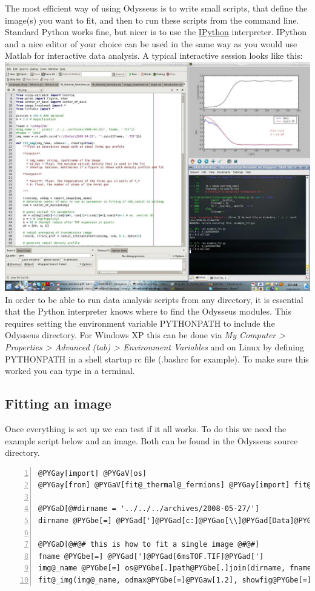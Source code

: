 \documentclass[letterpaper,10pt,english]{manual}
\begin{document}
The most efficient way of using Odysseus is to write small scripts, that define the image(s) you want to fit, and then to run these scripts from the command line. Standard Python works fine, but nicer is to use the \href{http://ipython.scipy.org/moin/}{IPython} interpreter. IPython and a nice editor of your choice can be used in the same way as you would use Matlab for interactive data analysis. A typical interactive session looks like this:
\includegraphics[width=500pt]{interactive_python.jpg}
In order to be able to run data analysis scripts from any directory, it is essential that the Python interpreter knows where to find the Odysseus modules. This requires setting the environment variable PYTHONPATH to include the Odysseus directory. For Windows XP this can be done via \emph{My Computer \textgreater{} Properties \textgreater{} Advanced (tab) \textgreater{} Environment Variables} and on Linux by defining PYTHONPATH in a shell startup rc file (.bashrc for example). To make sure this worked you can type  in a terminal.


\subsection{Fitting an image}

Once everything is set up we can test if it all works. To do this we need the example script below and an image. Both can be found in the Odysseus source directory.

\begin{Verbatim}[commandchars=@\[\],numbers=left,firstnumber=1,stepnumber=1]
@PYGay[import] @PYGaV[os]
@PYGay[from] @PYGaV[fit@_thermal@_fermions] @PYGay[import] fit@_img

@PYGaD[@#dirname = '../../../archives/2008-05-27/']
dirname @PYGbe[=] @PYGad[']@PYGad[c:]@PYGao[\\]@PYGad[Data]@PYGao[\\]@PYGad[2008-05-27]@PYGad[']

@PYGaD[@#@# this is how to fit a single image @#@#]
fname @PYGbe[=] @PYGad[']@PYGad[6msTOF.TIF]@PYGad[']
img@_name @PYGbe[=] os@PYGbe[.]path@PYGbe[.]join(dirname, fname)
fit@_img(img@_name, odmax@PYGbe[=]@PYGaw[1.2], showfig@PYGbe[=]@PYGaA[True])
\end{Verbatim}
\end{document}
